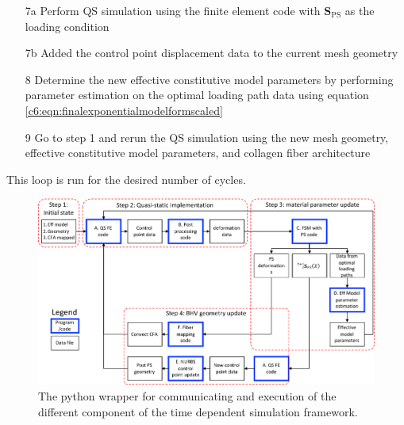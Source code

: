 \begin{enumerate}
        \item[7a] Perform QS simulation using the finite element code with $\mathbf{S}_\mathrm{PS}$ as the loading condition
        \item[7b] Added the control point displacement data to the current mesh geometry
        \item[8] Determine the new effective constitutive model parameters by performing parameter estimation on the optimal loading path data using equation \ref{c6:eqn:finalexponentialmodelformscaled}
        \item[9] Go to step 1 and rerun the QS simulation using the new mesh geometry, effective constitutive model parameters, and collagen fiber architecture
    \end{enumerate}
    This loop is run for the desired number of cycles. 
\begin{figure}
\centering
\includegraphics[width=8.2in]{Images/chapter6/pythonimplementation.pdf}
\caption{The python wrapper for communicating and execution of the different component of the time dependent simulation framework.}
\label{c6:fig:pythonimplementation}
\end{figure}
